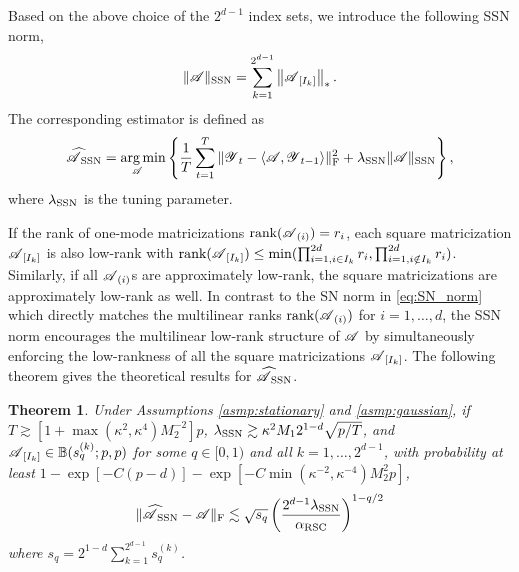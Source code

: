 \documentclass[12pt]{article}
\newtheorem{theorem}{Theorem}
\DeclareMathOperator*{\argmin}{arg\,min}
\newcommand{\cm}[1]{\mbox{\boldmath$\mathscr{#1}$}}
\begin{document}
Based on the above choice of the $2^{d-1}$ index sets,  we introduce the following SSN norm,
\begin{equation} \label{eq:SSN_norm}
\|\cm{A}\|_{\text{SSN}}=\sum_{k=1}^{2^{d-1}}\left\|\cm{A}_{[I_k]}\right\|_*.
\end{equation}
The corresponding estimator is defined as
\begin{equation}\label{eq:SSN_est}
\cm{\widehat{A}}_{\text{SSN}}=\underset{\scalebox{0.7}{\cm{A}}}{\argmin}\left\{\frac{1}{T}\sum_{t=1}^T\|\cm{Y}_t-\langle\cm{A},\cm{Y}_{t-1}\rangle\|_\text{F}^2+\lambda_{\textup{SSN}}\|\cm{A}\|_{\text{SSN}}\right\},
\end{equation}
where $\lambda_{\textup{SSN}}$ is the tuning parameter. 

If the rank of one-mode matricizations $\text{rank}(\cm{A}_{(i)})=r_i$, each square matricization $\cm{A}_{[I_k]}$ is also low-rank with $\text{rank}(\cm{A}_{[I_k]})\leq\min(\prod_{i=1,i\in I_k}^{2d}r_i,\prod_{i=1,i\notin I_k}^{2d}r_i)$. Similarly, if all $\cm{A}_{(i)}$s are approximately low-rank, the square matricizations are approximately low-rank as well. In contrast to the SN norm in \eqref{eq:SN_norm} which directly matches the multilinear ranks $\text{rank}(\cm{A}_{(i)})$ for $i=1,\dots, d$,  the SSN norm encourages the multilinear low-rank structure of $\cm{A}$ by simultaneously enforcing the low-rankness of all the square matricizations $\cm{A}_{[I_k]}$.
The following theorem gives the theoretical results for $\cm{\widehat{A}}_{\text{SSN}}$.

\begin{theorem} \label{thm:SSN}
Under Assumptions \ref{asmp:stationary} and \ref{asmp:gaussian}, if $T\gtrsim [1+\max(\kappa^2,\kappa^4)M_2^{-2}]p$, $\lambda_{\textup{SSN}}\gtrsim\kappa^2M_12^{1-d}\sqrt{p/T}$, and $\cm{A}_{[I_k]}\in\mathbb{B}(s_q^{(k)};p,p)$ for some $q\in[0,1)$ and all $k=1,\dots,2^{d-1}$, with probability at least $1-\exp[-C(p-d)]-\exp[-C\min(\kappa^{-2},\kappa^{-4})M_2^2p]$,
	\begin{equation}
	\|\cm{\widehat{A}}_{\textup{SSN}}-\cm{A}\|_{\textup{F}}\lesssim\sqrt{s_q}\left(\frac{2^{d-1}\lambda_{\textup{SSN}}}{\alpha_{\textup{RSC}}}\right)^{1-q/2}
	\end{equation}
	where $s_q=2^{1-d}\sum_{k=1}^{2^{d-1}}s_q^{(k)}$.
\end{theorem}
\end{document}
